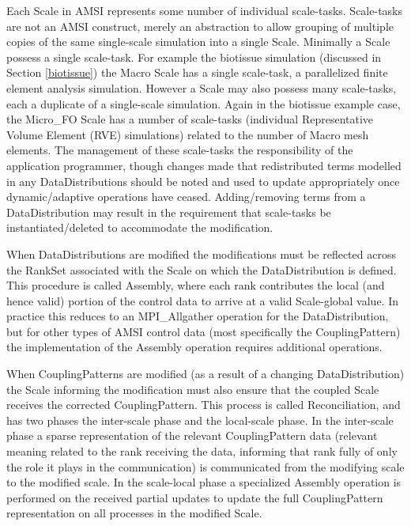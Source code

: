 \documentclass[11pt]{article}
\begin{document}
Each Scale in AMSI represents some number of individual scale-tasks. 
Scale-tasks are not an AMSI construct, merely an abstraction to allow grouping of multiple copies of the same single-scale simulation into a single Scale. 
Minimally a Scale possess a single scale-task. 
For example the biotissue simulation (discussed in Section \ref{biotissue}) the Macro Scale has a single scale-task, a parallelized finite element analysis simulation.
However a Scale may also possess many scale-tasks, each a duplicate of a single-scale simulation.
Again in the biotissue example case, the Micro\_FO Scale has a number of scale-tasks (individual Representative Volume Element (RVE) simulations) related to the number of Macro mesh elements.
The management of these scale-tasks the responsibility of the application programmer, though changes made that redistributed terms modelled in any DataDistributions should be noted and used to update appropriately once dynamic/adaptive operations have ceased. 
Adding/removing terms from a DataDistribution may result in the requirement that scale-tasks be instantiated/deleted to accommodate the modification.

When DataDistributions are modified the modifications must be reflected across the RankSet associated with the Scale on which the DataDistribution is defined. 
This procedure is called Assembly, where each rank contributes the local (and hence valid) portion of the control data to arrive at a valid Scale-global value.
In practice this reduces to an MPI\_Allgather operation for the DataDistribution, but for other types of AMSI control data (most specifically the CouplingPattern) the implementation of the Assembly operation requires additional operations. 

When CouplingPatterns are modified (as a result of a changing DataDistribution) the Scale informing the modification must also ensure that the coupled Scale receives the corrected CouplingPattern. 
This process is called Reconciliation, and has two phases the inter-scale phase and the local-scale phase.
In the inter-scale phase a sparse representation of the relevant CouplingPattern data (relevant meaning related to the rank receiving the data, informing that rank fully of only the role it plays in the communication) is communicated from the modifying scale to the modified scale. 
In the scale-local phase a specialized Assembly operation is performed on the received partial updates to update the full CouplingPattern representation on all processes in the modified Scale.
\end{document}
